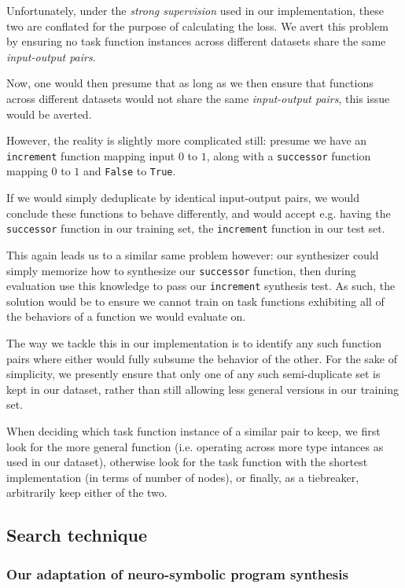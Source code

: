 \documentclass{article}
\begin{document}
    Unfortunately, under the \emph{strong supervision} used in our implementation,
    these two are conflated for the purpose of calculating the loss.
We avert this problem by ensuring no task function instances across different datasets share the same \emph{input-output pairs}.

Now, one would then presume that as long as we then ensure
that functions across different datasets
would not share the same \emph{input-output pairs},
this issue would be averted.

However, the reality is slightly more complicated still:
presume we have an \verb|increment| function mapping input $0$ to $1$,
along with a \verb|successor| function mapping $0$ to $1$ and \verb|False| to \verb|True|.

If we would simply deduplicate by identical input-output pairs,
we would conclude these functions to behave differently,
and would accept e.g. having the \verb|successor| function in our training set,
the \verb|increment| function in our test set.

This again leads us to a similar same problem however:
our synthesizer could simply memorize how to synthesize our \verb|successor| function,
then during evaluation use this knowledge to pass our \verb|increment| synthesis test.
As such, the solution would be to ensure we cannot train on task functions exhibiting all of the behaviors of a function we would evaluate on.

The way we tackle this in our implementation is to identify any such function pairs where either would fully subsume the behavior of the other.
For the sake of simplicity, we presently ensure that only one of any such semi-duplicate set is kept in our dataset,
rather than still allowing less general versions in our training set.

When deciding which task function instance of a similar pair to keep,
we first look for the more general function (i.e. operating across more type intances as used in our dataset),
otherwise look for the task function with the shortest implementation (in terms of number of nodes),
or finally, as a tiebreaker, arbitrarily keep either of the two.

\subsection{Search technique}

\subsubsection{Our adaptation of neuro-symbolic program synthesis} \label{sec:ournsps}
\end{document}
